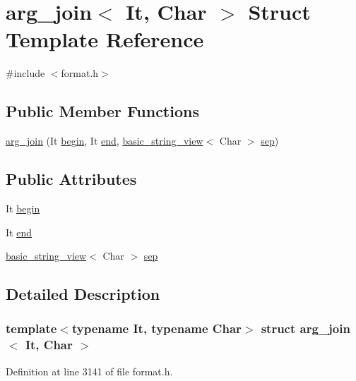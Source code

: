 \hypertarget{structarg__join}{}\section{arg\+\_\+join$<$ It, Char $>$ Struct Template Reference}
\label{structarg__join}


{\ttfamily \#include $<$format.\+h$>$}

\subsection*{Public Member Functions}
\begin{DoxyCompactItemize}
\item 
\hyperlink{structarg__join_a15d46ecf09e348bc6a1661b01b07f793}{arg\+\_\+join} (It \hyperlink{structarg__join_ac8f29af772de01a375a649dbb41ea3cc}{begin}, It \hyperlink{structarg__join_a01b412e9e99d7fad229fcd9a7a4bede7}{end}, \hyperlink{classbasic__string__view}{basic\+\_\+string\+\_\+view}$<$ Char $>$ \hyperlink{structarg__join_a67aae7f3c5d2573a5fb85de3c5fd9b3d}{sep})
\end{DoxyCompactItemize}
\subsection*{Public Attributes}
\begin{DoxyCompactItemize}
\item 
It \hyperlink{structarg__join_ac8f29af772de01a375a649dbb41ea3cc}{begin}
\item 
It \hyperlink{structarg__join_a01b412e9e99d7fad229fcd9a7a4bede7}{end}
\item 
\hyperlink{classbasic__string__view}{basic\+\_\+string\+\_\+view}$<$ Char $>$ \hyperlink{structarg__join_a67aae7f3c5d2573a5fb85de3c5fd9b3d}{sep}
\end{DoxyCompactItemize}


\subsection{Detailed Description}
\subsubsection*{template$<$typename It, typename Char$>$\newline
struct arg\+\_\+join$<$ It, Char $>$}



Definition at line 3141 of file format.\+h.



